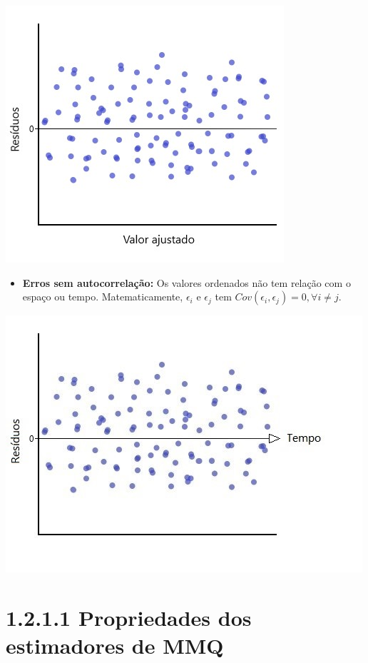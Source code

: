 \documentclass[
]{article}
\providecommand{\tightlist}{%
  \setlength{\itemsep}{0pt}\setlength{\parskip}{0pt}}
\begin{document}
\includegraphics{images/homoresi.jpg}

\begin{itemize}
\tightlist
\item
  \textbf{Erros sem autocorrelação:} Os valores ordenados não tem
  relação com o espaço ou tempo. Matematicamente, \(\epsilon_i\) e
  \(\epsilon_j\) tem \(Cov(\epsilon_i, \epsilon_j)=0, \forall i \ne j\).
\end{itemize}

\includegraphics{images/autocor.jpg}

\hypertarget{propriedades-dos-estimadores-de-mmq}{%
\section{1.2.1.1 Propriedades dos estimadores de
MMQ}\label{propriedades-dos-estimadores-de-mmq}}
\end{document}
